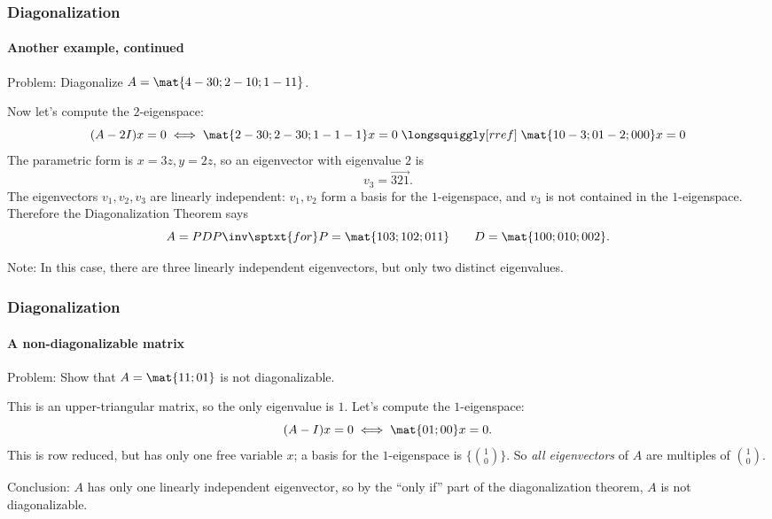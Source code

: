 
\begin{frame}
\frametitle{Diagonalization}
\framesubtitle{Another example, continued}

\alert{Problem:} Diagonalize $A = \mat{4 -3 0; 2 -1 0; 1 -1 1}$.

\begin{webonly}%
\displayskips{3pt}
Now let's compute the $2$-eigenspace:
\[ (A-2I)x = 0 \iff
\mat{2 -3 0; 2 -3 0; 1 -1 -1}x = 0
\;\longsquiggly[rref]\;
\mat{1 0 -3; 0 1 -2; 0 0 0}x = 0
\]
The parametric form is $x = 3z, y = 2z$, so an eigenvector with eigenvalue $2$ is
\[ v_3 = \vec{3 2 1}. \]
The eigenvectors $v_1,v_2,v_3$ are linearly independent: $v_1,v_2$ form a basis
for the $1$-eigenspace, and $v_3$ is not contained in the $1$-eigenspace.
Therefore the Diagonalization Theorem says
\[ A = PDP\inv \sptxt{for}  
P = \mat{1 0 3; 1 0 2; 0 1 1} \qquad D = \mat{1 0 0; 0 1 0; 0 0 2}. \]
\end{webonly}%
\pause
\alert{Note:} In this case, there are three linearly independent eigenvectors, but
only two distinct eigenvalues.
\end{frame}



\begin{frame}
\frametitle{Diagonalization}
\framesubtitle{A non-diagonalizable matrix}

\alert{Problem:} Show that $A = \mat{1 1; 0 1}$ is not diagonalizable.

\medskip
\begin{webonly}%
This is an upper-triangular matrix, so the only eigenvalue is $1$.
Let's compute the $1$-eigenspace:
\[ (A-I)x = 0 \iff \mat{0 1; 0 0}x = 0. \]
This is row reduced, but has only one free variable $x$; a basis for the
$1$-eigenspace is $\{{1\choose 0}\}$.
So \emph{all eigenvectors} of $A$ are multiples of ${1\choose 0}$.
\end{webonly}

\pause\bigskip
\alert{Conclusion:}
$A$ has only one linearly independent eigenvector, so by the ``only if'' part of
the diagonalization theorem, $A$ is not diagonalizable.

\end{frame}



